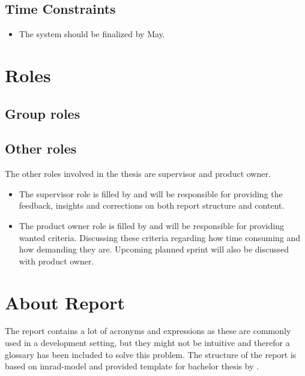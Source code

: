 \subsection{Time Constraints}

\begin{itemize}
    \item The system should be finalized by  May.
\end{itemize}

\section{Roles}
\subsection{Group roles}


\subsection{Other roles}
The other roles involved in the thesis are supervisor and product owner.
\begin{itemize}
    \item The supervisor role is filled by \supervisor{} and will be responsible for providing the feedback, insights and corrections on both report structure and content.
    \item The product owner role is filled by \productowner{} and will be responsible for providing wanted criteria. Discussing these criteria regarding how time consuming and how demanding they are. Upcoming planned sprint will also be discussed with product owner.
\end{itemize}


\section{About Report}
The report contains a lot of acronyms and expressions as these are commonly used in a development setting, but they might not be intuitive and therefor a glossary has been included to solve this problem. The structure of the report is based on \gls{imrad}-model and provided template for bachelor thesis by \NTNUgjovik{}.

